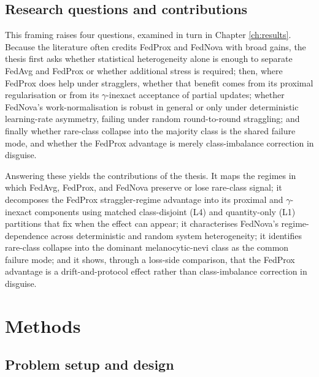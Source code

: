 \documentclass[11pt,a4paper]{report}
\begin{document}
\section{Research questions and contributions}
\label{sec:intro-questions}

This framing raises four questions, examined in turn in
Chapter \ref{ch:results}. Because the literature often credits FedProx and
FedNova with broad gains, the thesis first asks whether statistical heterogeneity
alone is enough to separate FedAvg and FedProx or whether additional stress is
required; then, where FedProx does help under stragglers, whether that benefit
comes from its proximal regularisation or from its $\gamma$-inexact acceptance of
partial updates; whether FedNova's work-normalisation is robust in general or
only under deterministic learning-rate asymmetry, failing under random
round-to-round straggling; and finally whether rare-class collapse into the
majority class is the shared failure mode, and whether the FedProx advantage is
merely class-imbalance correction in disguise.

Answering these yields the contributions of the thesis. It maps the regimes in
which FedAvg, FedProx, and FedNova preserve or lose rare-class signal; it
decomposes the FedProx straggler-regime advantage into its proximal and
$\gamma$-inexact components using matched class-disjoint (L4) and quantity-only
(L1) partitions that fix when the effect can appear; it characterises FedNova's
regime-dependence across deterministic and random system heterogeneity; it
identifies rare-class collapse into the dominant melanocytic-nevi class as the
common failure mode; and it shows, through a loss-side comparison, that the
FedProx advantage is a drift-and-protocol effect rather than class-imbalance
correction in disguise.


\chapter{Methods}
\label{ch:methods}

\section{Problem setup and design}
\label{sec:method-problem}
\label{sec:method-rationale}
\end{document}
